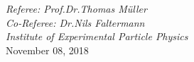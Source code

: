 \begin{titlepage}
\begin{addmargin}[1.5cm]{0cm}
\begin{center}
{  %
  \large{\textit{Referee: Prof.\;Dr.\;Thomas Müller}}\\
  \large{\textit{Co-Referee: Dr.\;Nils Faltermann}}\\
   \vspace{0.2 cm}
\large{\textit{Institute of Experimental Particle Physics}}\\


  \vspace{1.0cm}
  \large{November 08, 2018}%
}
\end{center}
\end{addmargin}
\end{titlepage}
